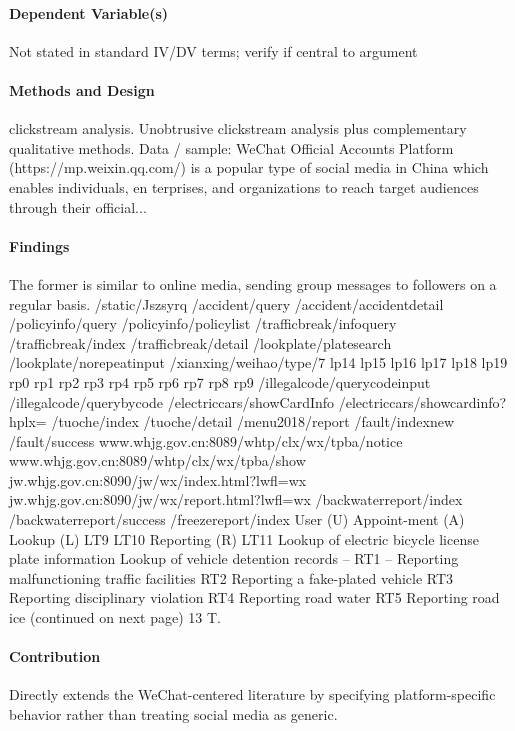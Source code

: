 \documentclass[12pt]{article}
\begin{document}
\paragraph{Dependent Variable(s)} Not stated in standard IV/DV terms; verify if central to argument

\paragraph{Methods and Design} clickstream analysis. Unobtrusive clickstream analysis plus complementary qualitative methods. Data / sample: WeChat Official Accounts Platform (https://mp.weixin.qq.com/) is a popular type of social media in China which enables individuals, en terprises, and organizations to reach target audiences through their official...

\paragraph{Findings} The former is similar to online media, sending group messages to followers on a regular basis. /static/Jszsyrq /accident/query /accident/accidentdetail /policyinfo/query /policyinfo/policylist /trafficbreak/infoquery /trafficbreak/index /trafficbreak/detail /lookplate/platesearch /lookplate/norepeatinput /xianxing/weihao/type/7 lp14 lp15 lp16 lp17 lp18 lp19 rp0 rp1 rp2 rp3 rp4 rp5 rp6 rp7 rp8 rp9 /illegalcode/querycodeinput /illegalcode/querybycode /electriccars/showCardInfo /electriccars/showcardinfo?hplx= /tuoche/index /tuoche/detail /menu2018/report /fault/indexnew /fault/success www.whjg.gov.cn:8089/whtp/clx/wx/tpba/notice www.whjg.gov.cn:8089/whtp/clx/wx/tpba/show jw.whjg.gov.cn:8090/jw/wx/index.html?lwfl=wx jw.whjg.gov.cn:8090/jw/wx/report.html?lwfl=wx /backwaterreport/index /backwaterreport/success /freezereport/index User (U) Appoint-ment (A) Lookup (L) LT9 LT10 Reporting (R) LT11 Lookup of electric bicycle license plate information Lookup of vehicle detention records -- RT1 -- Reporting malfunctioning traffic facilities RT2 Reporting a fake-plated vehicle RT3 Reporting disciplinary violation RT4 Reporting road water RT5 Reporting road ice (continued on next page) 13 T.

\paragraph{Contribution} Directly extends the WeChat-centered literature by specifying platform-specific behavior rather than treating social media as generic.
\end{document}
